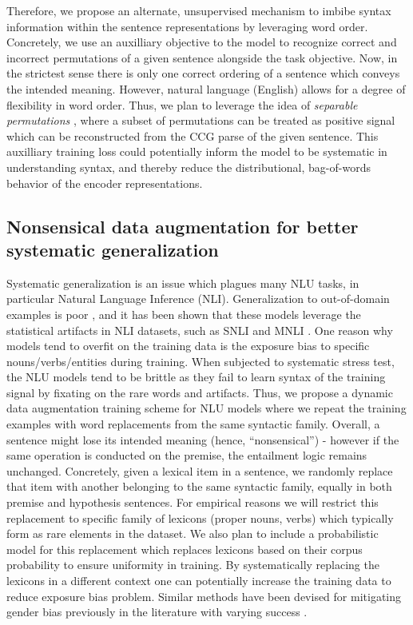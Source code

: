 \documentclass[12pt]{article}
\begin{document}
\begin{itemize}
Therefore, we propose an alternate, unsupervised mechanism to imbibe syntax information within the sentence representations by leveraging word order. Concretely, we use an auxilliary objective to the model to recognize correct and incorrect permutations of a given sentence alongside the task objective. Now, in the strictest sense there is only one correct ordering of a sentence which conveys the intended meaning. However, natural language (English) allows for a degree of flexibility in word order. Thus, we plan to leverage the idea of \textit{separable permutations} \cite{stanojevic2021}, where a subset of permutations can be treated as positive signal which can be reconstructed from the CCG parse of the given sentence. This auxilliary training loss could potentially inform the model to be systematic in understanding syntax, and thereby reduce the distributional, bag-of-words behavior of the encoder representations.


\subsection{Nonsensical data augmentation for better systematic generalization}

Systematic generalization is an issue which plagues many NLU tasks, in particular Natural Language Inference (NLI). Generalization to out-of-domain examples is poor \cite{nie2020}, and it has been shown that these models leverage the statistical artifacts in NLI datasets, such as SNLI and MNLI \cite{gururangan2018a}. One reason why models tend to overfit on the training data is the exposure bias to specific nouns/verbs/entities during training. When subjected to systematic stress test, the NLU models tend to be brittle as they fail to learn syntax of the training signal by fixating on the rare words and artifacts. Thus, we propose a dynamic data augmentation training scheme for NLU models where we repeat the training examples with word replacements from the same syntactic family. Overall, a sentence might lose its intended meaning (hence, ``nonsensical'') - however if the same operation is conducted on the premise, the entailment logic remains unchanged. Concretely, given a lexical item in a sentence, we randomly replace that item with another belonging to the same syntactic family, equally in both premise and hypothesis sentences. For empirical reasons we will restrict this replacement to specific family of lexicons (proper nouns, verbs) which typically form as rare elements in the dataset. We also plan to include a probabilistic model for this replacement which replaces lexicons based on their corpus probability to ensure uniformity in training. By systematically replacing the lexicons in a different context one can potentially increase the training data to reduce exposure bias problem. Similar methods have been devised for mitigating gender bias previously in the literature with varying success \cite{maudslay2020b}.


\end{itemize}
\end{document}

